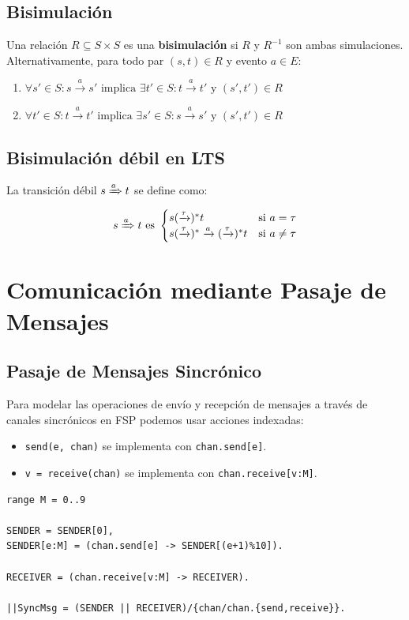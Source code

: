 \documentclass[11pt,a4paper]{article}
\begin{document}
\subsection{Bisimulación}
Una relación $R \subseteq S \times S$ es una \textbf{bisimulación} si $R$ y $R^{-1}$ son ambas simulaciones. Alternativamente, para todo par $(s, t) \in R$ y evento $a \in E$:
\begin{enumerate}
    \item $\forall s' \in S : s \xrightarrow{a} s' \text{ implica } \exists t' \in S : t \xrightarrow{a} t' \text{ y } (s', t') \in R$
    \item $\forall t' \in S : t \xrightarrow{a} t' \text{ implica } \exists s' \in S : s \xrightarrow{a} s' \text{ y } (s', t') \in R$
\end{enumerate}

\subsection{Bisimulación débil en LTS}
La transición débil $s \xRightarrow{a} t$ se define como:
\[ s \xRightarrow{a} t \text{ es } \begin{cases} 
s (\xrightarrow{\tau})^* t & \text{si } a = \tau \\ 
s (\xrightarrow{\tau})^* \xrightarrow{a} (\xrightarrow{\tau})^* t & \text{si } a \neq \tau 
\end{cases} \]

\section{Comunicación mediante Pasaje de Mensajes}

\subsection{Pasaje de Mensajes Sincrónico}
Para modelar las operaciones de envío y recepción de mensajes a través de canales sincrónicos en FSP podemos usar acciones indexadas:

\begin{itemize}
    \item \texttt{send(e, chan)} se implementa con \texttt{chan.send[e]}.
    \item \texttt{v = receive(chan)} se implementa con \texttt{chan.receive[v:M]}.
\end{itemize}

\begin{lstlisting}[caption=Modelo Sincrónico]
range M = 0..9

SENDER = SENDER[0],
SENDER[e:M] = (chan.send[e] -> SENDER[(e+1)%10]).

RECEIVER = (chan.receive[v:M] -> RECEIVER).

||SyncMsg = (SENDER || RECEIVER)/{chan/chan.{send,receive}}.
\end{lstlisting}
\end{document}
